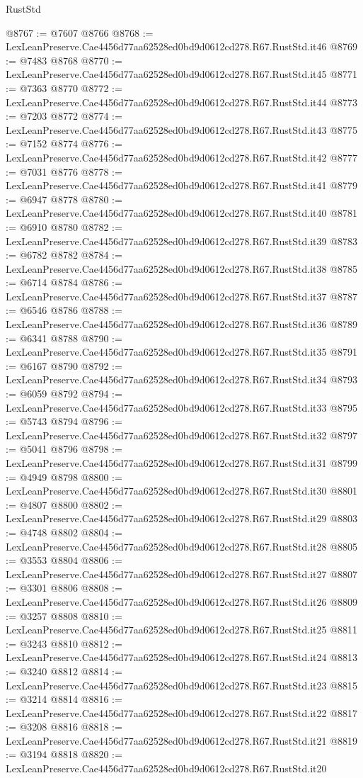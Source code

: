 \begin{lexlean}{RustStd}
\begin{coremodule}
@8767 := @7607 @8766
@8768 := LexLeanPreserve.Cae4456d77aa62528ed0bd9d0612cd278.R67.RustStd.it46
@8769 := @7483 @8768
@8770 := LexLeanPreserve.Cae4456d77aa62528ed0bd9d0612cd278.R67.RustStd.it45
@8771 := @7363 @8770
@8772 := LexLeanPreserve.Cae4456d77aa62528ed0bd9d0612cd278.R67.RustStd.it44
@8773 := @7203 @8772
@8774 := LexLeanPreserve.Cae4456d77aa62528ed0bd9d0612cd278.R67.RustStd.it43
@8775 := @7152 @8774
@8776 := LexLeanPreserve.Cae4456d77aa62528ed0bd9d0612cd278.R67.RustStd.it42
@8777 := @7031 @8776
@8778 := LexLeanPreserve.Cae4456d77aa62528ed0bd9d0612cd278.R67.RustStd.it41
@8779 := @6947 @8778
@8780 := LexLeanPreserve.Cae4456d77aa62528ed0bd9d0612cd278.R67.RustStd.it40
@8781 := @6910 @8780
@8782 := LexLeanPreserve.Cae4456d77aa62528ed0bd9d0612cd278.R67.RustStd.it39
@8783 := @6782 @8782
@8784 := LexLeanPreserve.Cae4456d77aa62528ed0bd9d0612cd278.R67.RustStd.it38
@8785 := @6714 @8784
@8786 := LexLeanPreserve.Cae4456d77aa62528ed0bd9d0612cd278.R67.RustStd.it37
@8787 := @6546 @8786
@8788 := LexLeanPreserve.Cae4456d77aa62528ed0bd9d0612cd278.R67.RustStd.it36
@8789 := @6341 @8788
@8790 := LexLeanPreserve.Cae4456d77aa62528ed0bd9d0612cd278.R67.RustStd.it35
@8791 := @6167 @8790
@8792 := LexLeanPreserve.Cae4456d77aa62528ed0bd9d0612cd278.R67.RustStd.it34
@8793 := @6059 @8792
@8794 := LexLeanPreserve.Cae4456d77aa62528ed0bd9d0612cd278.R67.RustStd.it33
@8795 := @5743 @8794
@8796 := LexLeanPreserve.Cae4456d77aa62528ed0bd9d0612cd278.R67.RustStd.it32
@8797 := @5041 @8796
@8798 := LexLeanPreserve.Cae4456d77aa62528ed0bd9d0612cd278.R67.RustStd.it31
@8799 := @4949 @8798
@8800 := LexLeanPreserve.Cae4456d77aa62528ed0bd9d0612cd278.R67.RustStd.it30
@8801 := @4807 @8800
@8802 := LexLeanPreserve.Cae4456d77aa62528ed0bd9d0612cd278.R67.RustStd.it29
@8803 := @4748 @8802
@8804 := LexLeanPreserve.Cae4456d77aa62528ed0bd9d0612cd278.R67.RustStd.it28
@8805 := @3553 @8804
@8806 := LexLeanPreserve.Cae4456d77aa62528ed0bd9d0612cd278.R67.RustStd.it27
@8807 := @3301 @8806
@8808 := LexLeanPreserve.Cae4456d77aa62528ed0bd9d0612cd278.R67.RustStd.it26
@8809 := @3257 @8808
@8810 := LexLeanPreserve.Cae4456d77aa62528ed0bd9d0612cd278.R67.RustStd.it25
@8811 := @3243 @8810
@8812 := LexLeanPreserve.Cae4456d77aa62528ed0bd9d0612cd278.R67.RustStd.it24
@8813 := @3240 @8812
@8814 := LexLeanPreserve.Cae4456d77aa62528ed0bd9d0612cd278.R67.RustStd.it23
@8815 := @3214 @8814
@8816 := LexLeanPreserve.Cae4456d77aa62528ed0bd9d0612cd278.R67.RustStd.it22
@8817 := @3208 @8816
@8818 := LexLeanPreserve.Cae4456d77aa62528ed0bd9d0612cd278.R67.RustStd.it21
@8819 := @3194 @8818
@8820 := LexLeanPreserve.Cae4456d77aa62528ed0bd9d0612cd278.R67.RustStd.it20

\end{coremodule}
\end{lexlean}
